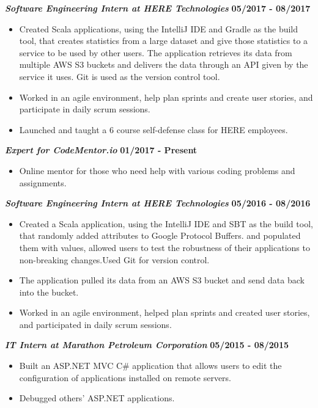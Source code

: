 \documentclass[10pt]{res}
\begin{document}
\begin{resume}
	\textbf{\textit{Software Engineering Intern at HERE Technologies}}
	\vspace*{.25em}
	\hfill{\bf 05/2017 - 08/2017}
	\begin{itemize}
		\item Created Scala applications, using the IntelliJ IDE and Gradle as the build tool, that creates statistics from a large dataset and give those statistics to a service to be used by other users. The application retrieves its data from multiple AWS S3 buckets and delivers the data through an API given by the service it uses. Git is used as the version control tool. 
\item Worked in an agile environment, help plan sprints and create user stories, and participate in daily scrum sessions. 
\item Launched and taught a 6 course self-defense class for HERE employees. 
	\end{itemize}

\textbf{\textit{Expert for CodeMentor.io}}
	\vspace*{.25em}
	\hfill{\bf 01/2017 - Present}
	\begin{itemize}
		\item Online mentor for those who need help with various coding problems and assignments. 
	\end{itemize}
	
	\textbf{\textit{Software Engineering Intern at HERE Technologies}}
	\vspace*{.25em}
	\hfill {\bf 05/2016 - 08/2016}
	\begin{itemize}
	  \item Created a Scala application, using the IntelliJ IDE and SBT as the build tool, that randomly added attributes to Google Protocol Buffers. 
 and populated them with values, allowed users to test the robustness of their applications to non-breaking changes.Used Git for version control. 
	\item The application pulled its data from an AWS S3 bucket and send data back into the bucket.
\item Worked in an agile environment, helped plan sprints and created user stories, and participated in daily scrum sessions. 
	\end{itemize}  
	\textbf{\textit{IT Intern at Marathon Petroleum Corporation}} \hfill {\bf 05/2015 - 08/2015}
	\vspace*{.25em}
	\begin{itemize}
  \setlength\itemsep{0em}
	  \item Built an ASP.NET MVC C\# application that allows users to edit the configuration of applications installed on remote servers.
	  \item Debugged others' ASP.NET applications.
\end{itemize}


\end{resume}
\end{document}
